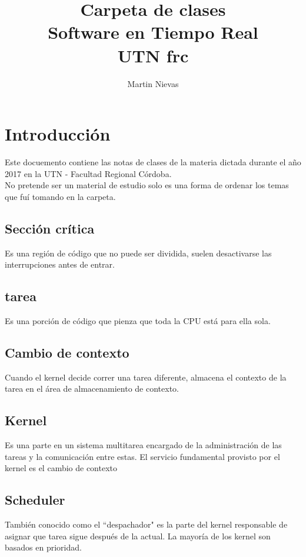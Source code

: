 \documentclass[a4paper]{article}
\title{Carpeta de clases \\Software en Tiempo Real \\UTN frc}
\author{Martin Nievas}
\begin{document}
\maketitle
\pagebreak
\makeindex
\section{Introducción} %
\label{sec:Introduccion}
Este docuemento contiene las notas de clases de la materia dictada durante el 
año 2017 en la UTN - Facultad Regional Córdoba.\\No pretende ser un material 
de estudio solo es una forma de ordenar los temas que fuí tomando en la carpeta.

\subsection{Sección crítica} %
Es una región de código que no puede ser dividida, suelen desactivarse las 
interrupciones antes de entrar.
\subsection{tarea} %
\label{sub:Tarea}
Es una porción de código que pienza que toda la CPU está para ella sola.


\subsection{Cambio de contexto} %
\label{sub:Cambio de contexto}
Cuando el kernel decide correr una tarea diferente, almacena el contexto de la 
tarea en el área de almacenamiento de contexto.
\subsection{Kernel} %
\label{sub:Kernel}
Es una parte en un sistema multitarea encargado de la administración de las 
tareas y la comunicación entre estas. El servicio fundamental provisto por el 
kernel es el cambio de contexto
\subsection{Scheduler} %
\label{sub:Scheduler}
También conocido como el ``despachador" es la parte del kernel responsable de 
asignar que tarea sigue después de la actual. La mayoría de los kernel son
basados en prioridad.
\end{document}
